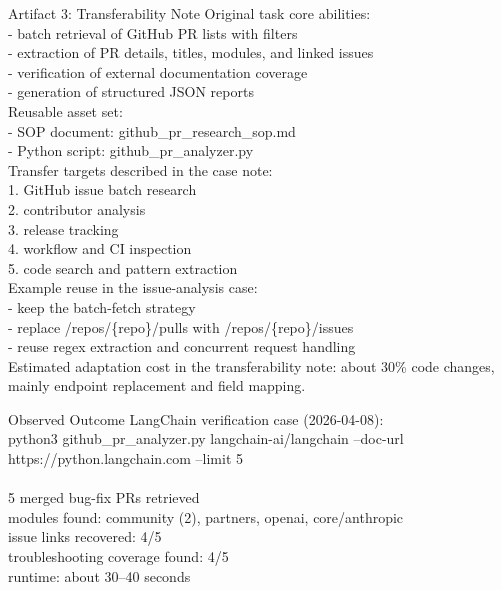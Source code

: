 \begin{CaseTraceBox}{Artifact 3: Transferability Note}
\small\ttfamily
Original task core abilities: \\
- batch retrieval of GitHub PR lists with filters \\
- extraction of PR details, titles, modules, and linked issues \\
- verification of external documentation coverage \\
- generation of structured JSON reports \\
Reusable asset set: \\
- SOP document: github\_pr\_research\_sop.md \\
- Python script: github\_pr\_analyzer.py \\
Transfer targets described in the case note: \\
1. GitHub issue batch research \\
2. contributor analysis \\
3. release tracking \\
4. workflow and CI inspection \\
5. code search and pattern extraction \\
Example reuse in the issue-analysis case: \\
- keep the batch-fetch strategy \\
- replace /repos/\{repo\}/pulls with /repos/\{repo\}/issues \\
- reuse regex extraction and concurrent request handling \\
Estimated adaptation cost in the transferability note: about 30\% code changes, mainly endpoint replacement and field mapping.
\end{CaseTraceBox}

\begin{CaseAnswerBox}{Observed Outcome}
\small\ttfamily
LangChain verification case (2026-04-08): \\
python3 github\_pr\_analyzer.py langchain-ai/langchain --doc-url https://python.langchain.com --limit 5 \\
\\
5 merged bug-fix PRs retrieved \\
modules found: community (2), partners, openai, core/anthropic \\
issue links recovered: 4/5 \\
troubleshooting coverage found: 4/5 \\
runtime: about 30--40 seconds
\end{CaseAnswerBox}

